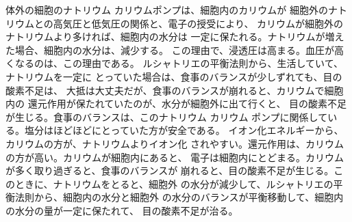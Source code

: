 \documentclass{jsarticle}
\begin{document}
\title{}
\author{}
\date{}
\maketitle
  体外の細胞のナトリウム カリウムポンプは、細胞内のカリウムが
  細胞外のナトリウムとの高気圧と低気圧の関係と、電子の授受により、
  カリウムが細胞外のナトリウムより多ければ、細胞内の水分は
  一定に保たれる。ナトリウムが増えた場合、細胞内の水分は、減少する。
  この理由で、浸透圧は高まる。血圧が高くなるのは、この理由である。
  ルシャトリエの平衡法則から、生活していて、ナトリウムを一定に
  とっていた場合は、食事のバランスが少しずれても、目の酸素不足は、
  大抵は大丈夫だが、食事のバランスが崩れると、カリウムで細胞内の
  還元作用が保たれていたのが、水分が細胞外に出て行くと、
  目の酸素不足が生じる。食事のバランスは、このナトリウム カリウム
  ポンプに関係している。塩分はほどほどにとっていた方が安全である。
  イオン化エネルギーから、カリウムの方が、ナトリウムよりイオン化
  されやすい。還元作用は、カリウムの方が高い。カリウムが細胞内にあると、
  電子は細胞内にとどまる。カリウムが多く取り過ぎると、食事のバランスが
  崩れると、目の酸素不足が生じる。このときに、ナトリウムをとると、細胞外
  の水分が減少して、ルシャトリエの平衡法則から、細胞内の水分と細胞外
  の水分のバランスが平衡移動して、細胞内の水分の量が一定に保たれて、
  目の酸素不足が治る。
\end{document}
